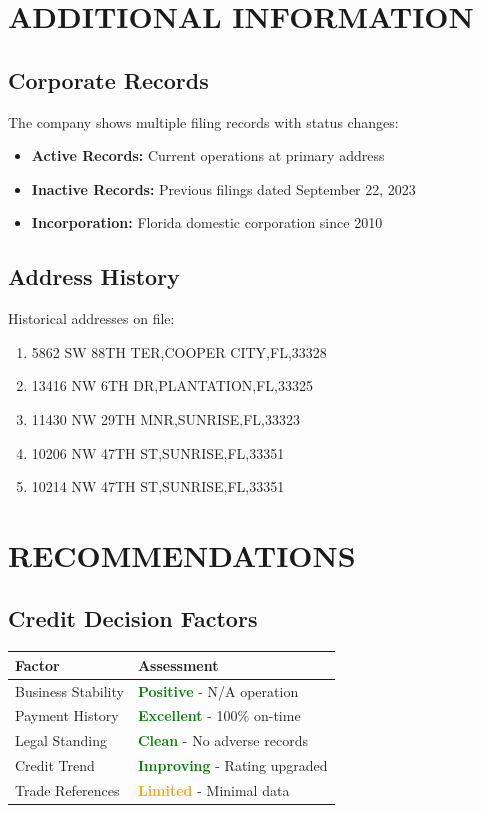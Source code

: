 \documentclass[11pt,a4paper]{article}
\begin{document}
\section{ADDITIONAL INFORMATION}

\subsection{Corporate Records}
The company shows multiple filing records with status changes:
\begin{itemize}
    \item \textbf{Active Records:} Current operations at primary address
    \item \textbf{Inactive Records:} Previous filings dated September 22, 2023
    \item \textbf{Incorporation:} Florida domestic corporation since 2010
\end{itemize}

\subsection{Address History}
Historical addresses on file:
\begin{enumerate}
    \item 5862 SW 88TH TER,COOPER CITY,FL,33328
\item 13416 NW 6TH DR,PLANTATION,FL,33325
\item 11430 NW 29TH MNR,SUNRISE,FL,33323
\item 10206 NW 47TH ST,SUNRISE,FL,33351
\item 10214 NW 47TH ST,SUNRISE,FL,33351

\end{enumerate}

\section{RECOMMENDATIONS}

\subsection{Credit Decision Factors}
\begin{tabularx}{\textwidth}{|>{\raggedright\arraybackslash}p{4cm}|>{\raggedright\arraybackslash}X|}
\hline
\rowcolor{lightgray}
\textbf{Factor} & \textbf{Assessment} \\
\hline
Business Stability & \textcolor{green}{\textbf{Positive}} - N/A operation \\
\hline
Payment History & \textcolor{green}{\textbf{Excellent}} - 100\% on-time \\
\hline
Legal Standing & \textcolor{green}{\textbf{Clean}} - No adverse records \\
\hline
Credit Trend & \textcolor{green}{\textbf{Improving}} - Rating upgraded \\
\hline
Trade References & \textcolor{orange}{\textbf{Limited}} - Minimal data \\
\hline
\end{tabularx}
\end{document}
